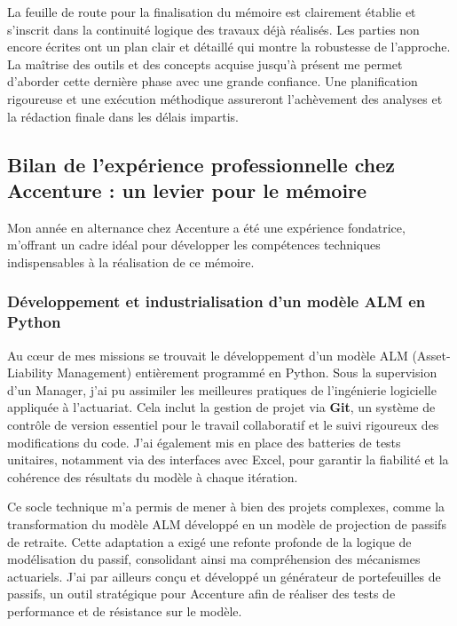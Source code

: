 La feuille de route pour la finalisation du mémoire est clairement établie et s'inscrit dans la continuité logique des travaux déjà réalisés. Les parties non encore écrites ont un plan clair et détaillé qui montre la robustesse de l'approche. La maîtrise des outils et des concepts acquise jusqu'à présent me permet d'aborder cette dernière phase avec une grande confiance. Une planification rigoureuse et une exécution méthodique assureront l'achèvement des analyses et la rédaction finale dans les délais impartis.

\subsection{Bilan de l'expérience professionnelle chez Accenture : un levier pour le mémoire}



Mon année en alternance chez Accenture a été une expérience fondatrice, m'offrant un cadre idéal pour développer les compétences techniques indispensables à la réalisation de ce mémoire.



\subsubsection{Développement et industrialisation d'un modèle ALM en Python}

Au cœur de mes missions se trouvait le développement d'un modèle ALM (Asset-Liability Management) entièrement programmé en Python. Sous la supervision d'un Manager, j'ai pu assimiler les meilleures pratiques de l'ingénierie logicielle appliquée à l'actuariat. Cela inclut la gestion de projet via \textbf{Git}, un système de contrôle de version essentiel pour le travail collaboratif et le suivi rigoureux des modifications du code. J'ai également mis en place des batteries de tests unitaires, notamment via des interfaces avec Excel, pour garantir la fiabilité et la cohérence des résultats du modèle à chaque itération.



Ce socle technique m'a permis de mener à bien des projets complexes, comme la transformation du modèle ALM développé en un modèle de projection de passifs de retraite. Cette adaptation a exigé une refonte profonde de la logique de modélisation du passif, consolidant ainsi ma compréhension des mécanismes actuariels. J'ai par ailleurs conçu et développé un générateur de portefeuilles de passifs, un outil stratégique pour Accenture afin de réaliser des tests de performance et de résistance sur le modèle.

